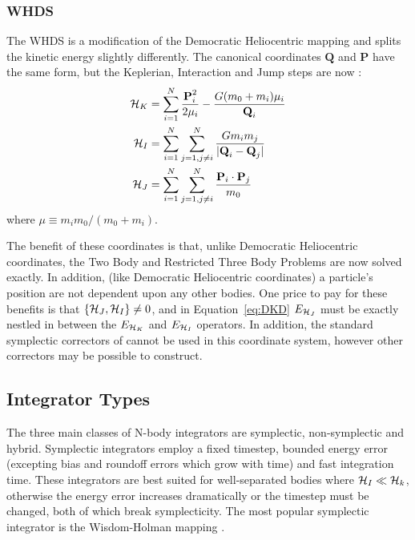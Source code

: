\subsubsection{WHDS}
\label{sec:whds}
The WHDS is a modification of the Democratic Heliocentric mapping and splits the kinetic energy slightly differently. 
The canonical coordinates $\textbf{Q}$ and $\textbf{P}$ have the same form, but the Keplerian, Interaction and Jump steps are now \citep{Laskar1995, Wisdom2006, Hernandez2016}:
\begin{align}
\begin{split}
\mathcal{H}_K &= \sum_{i=1}^N \frac{\textbf{P}_i^2}{2\mu_i} - \frac{G(m_0 + m_i)\mu_i}{\textbf{Q}_i} \\
\mathcal{H}_I &= \sum_{i=1}^{N}\sum_{j=1,j \ne i}^N \frac{Gm_im_j}{|\textbf{Q}_i - \textbf{Q}_j|} \\
\mathcal{H}_J &= \sum_{i=1}^{N}\sum_{j=1,j \ne i}^N \frac{\textbf{P}_i \cdot \textbf{P}_j}{m_0}
\end{split}
\end{align}
where $\mu \equiv m_im_0/(m_0 + m_i)$.

The benefit of these coordinates is that, unlike Democratic Heliocentric coordinates, the Two Body and Restricted Three Body Problems are now solved exactly. 
In addition, (like Democratic Heliocentric coordinates) a particle's position are not dependent upon any other bodies. 
One price to pay for these benefits is that $\{\mathcal{H}_J, \mathcal{H}_I\} \ne 0$, and in Equation~\ref{eq:DKD} $E_{\mathcal{H}_J}$ must be exactly nestled in between the $E_{\mathcal{H}_K}$ and $E_{\mathcal{H}_I}$ operators.
In addition, the standard symplectic correctors of \citet{Wisdom2006} cannot be used in this coordinate system, however other correctors may be possible to construct. 

\subsection{Integrator Types}
\label{sec:inttypes}
The three main classes of N-body integrators are symplectic, non-symplectic and hybrid. 
Symplectic integrators employ a fixed timestep, bounded energy error (excepting bias and roundoff errors which grow with time) and fast integration time.
These integrators are best suited for well-separated bodies where $\mathcal{H}_I \ll \mathcal{H}_k$, otherwise the energy error increases dramatically or the timestep must be changed, both of which break symplecticity. 
The most popular symplectic integrator is the Wisdom-Holman mapping \citep{Wisdom1991}.

